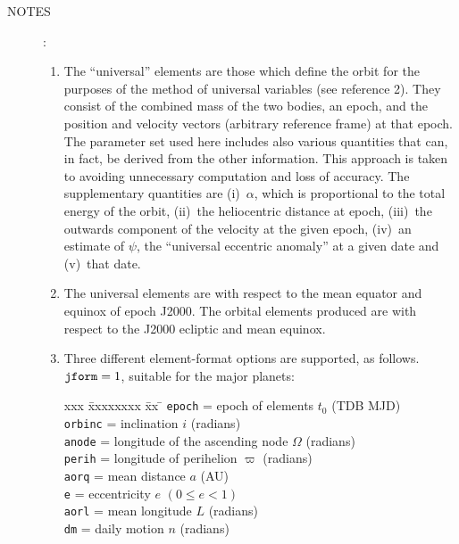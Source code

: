 \documentclass[11pt,fleqn,twoside]{article}
\renewcommand{\_}{{\tt\char'137}}     %
\newlength{\oldspacing}
\newcommand{\notes}[1]
{
  \goodbreak
  \setlength{\oldspacing}{\topsep}
  \setlength{\topsep}{0.3ex}
  \begin{description}
    \item[NOTES]:
        #1
  \end{description}
  \setlength{\topsep}{\oldspacing}
}
\begin{document}
\notes
{
 \begin{enumerate}
  \setlength{\parskip}{\medskipamount}
  \item The ``universal'' elements are those which define the orbit for the
        purposes of the method of universal variables (see reference 2).
        They consist of the combined mass of the two bodies, an epoch,
        and the position and velocity vectors (arbitrary reference frame)
        at that epoch.  The parameter set used here includes also various
        quantities that can, in fact, be derived from the other
        information.  This approach is taken to avoiding unnecessary
        computation and loss of accuracy.  The supplementary quantities
        are (i)~$\alpha$, which is proportional to the total energy of the
        orbit, (ii)~the heliocentric distance at epoch,
        (iii)~the outwards component of the velocity at the given epoch,
        (iv)~an estimate of $\psi$, the ``universal eccentric anomaly'' at a
        given date and (v)~that date.
  \item The universal elements are with respect to the mean equator and
        equinox of epoch J2000.  The orbital elements produced are with
        respect to the J2000 ecliptic and mean equinox.
  \item Three different element-format options are supported, as
        follows. \\
 
        ${\tt jform}=1$, suitable for the major planets:
 
        \begin{tabbing}
        xxx \= xxxxxxxx \= xx \= \kill
        \> {\tt epoch}  \> = \> epoch of elements $t_0$ (TDB MJD) \\
        \> {\tt orbinc} \> = \> inclination $i$ (radians) \\
        \> {\tt anode}  \> = \> longitude of the
                                ascending node $\Omega$ (radians) \\
        \> {\tt perih}  \> = \> longitude of perihelion
                                $\varpi$ (radians) \\
        \> {\tt aorq}   \> = \> mean distance $a$ (AU) \\
        \> {\tt e}      \> = \> eccentricity $e$ $( 0 \leq e < 1 )$ \\
        \> {\tt aorl}   \> = \> mean longitude $L$ (radians) \\
        \> {\tt dm}     \> = \> daily motion $n$ (radians)
        \end{tabbing}
 

\end{enumerate}}
\end{document}
